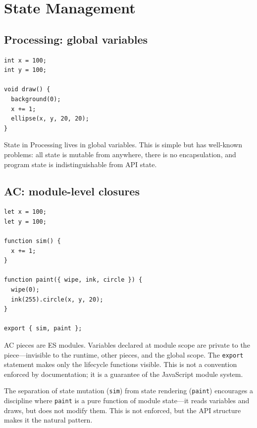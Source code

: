 \documentclass[10pt,letterpaper,twocolumn]{article}
\begin{document}

\section{State Management}
\label{sec:state}

\subsection{Processing: global variables}

\begin{lstlisting}[style=processingstyle]
int x = 100;
int y = 100;

void draw() {
  background(0);
  x += 1;
  ellipse(x, y, 20, 20);
}
\end{lstlisting}

State in Processing lives in global variables. This is simple but has well-known problems: all state is mutable from anywhere, there is no encapsulation, and program state is indistinguishable from API state.

\subsection{AC: module-level closures}

\begin{lstlisting}[style=acjsstyle]
let x = 100;
let y = 100;

function sim() {
  x += 1;
}

function paint({ wipe, ink, circle }) {
  wipe(0);
  ink(255).circle(x, y, 20);
}

export { sim, paint };
\end{lstlisting}

AC pieces are ES modules. Variables declared at module scope are private to the piece---invisible to the runtime, other pieces, and the global scope. The \texttt{export} statement makes only the lifecycle functions visible. This is not a convention enforced by documentation; it is a guarantee of the JavaScript module system.

The separation of state mutation (\texttt{sim}) from state rendering (\texttt{paint}) encourages a discipline where \texttt{paint} is a pure function of module state---it reads variables and draws, but does not modify them. This is not enforced, but the API structure makes it the natural pattern.

\end{document}
